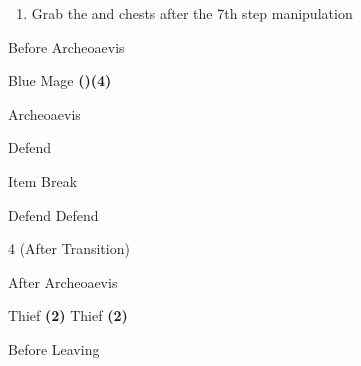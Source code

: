 \begin{paracol}{2}
\switchcolumn*
\begin{enumerate}[resume]
    \item Grab the  and  chests after the 7th step manipulation
\end{enumerate}

\begin{menu}{Before Archeoaevis}
    \varwb
    \begin{notes}
        \item {}
    \end{notes}
    \begin{jobMenu}
        \bartz Blue Mage \textbf{(\pointDown)(4\pointRight)} \optimize \space \equip{\thunderRod}
    \end{jobMenu}
    \varwe
\end{menu}


\switchcolumnTwice
\begin{boss}{Archeoaevis}
	\varwb
	\begin{round}{1}
		\lenna \leftCommand{\throw} \then \thunderScroll
        \galuf Defend
        \item {}
        \item {}
        \faris \leftCommand{\gaia}
        \bartz Item \then \battleGroup{\thunderRod} \then Break
	\end{round}
    \begin{round}{2}
        \lenna \leftCommand{\throw} \then \thunderScroll
        \galuf Defend
        \faris \leftCommand{\gaia}
        \lenna \leftCommand{\throw} \then \thunderScroll
        \bartz Defend
    \end{round}
    \begin{round}{3}
        \galuf \leftCommand{\throw} \then \thunderScroll
        \faris \leftCommand{\gaia}
        \lenna \leftCommand{\throw} \then \shuriken
        \galuf \leftCommand{\throw} \then \ancientSword
    \end{round}
    \begin{round}{4 (After Transition)}
        \bartz \leftCommand{\blue} \then \lfiveDeath
    \end{round}
	\varwe
\end{boss}

\switchcolumnTwice[*]
\begin{menu}{After Archeoaevis}
    \varwb
    \begin{jobMenu}
        \lenna Thief \textbf{(2\pointRight)} \ability{!\tame}
        \galuf Thief \textbf{(2\pointRight)}
    \end{jobMenu}
    \varwe
\end{menu}

\switchcolumn
\begin{steproute}{Before Leaving}
\end{steproute}

\end{paracol}